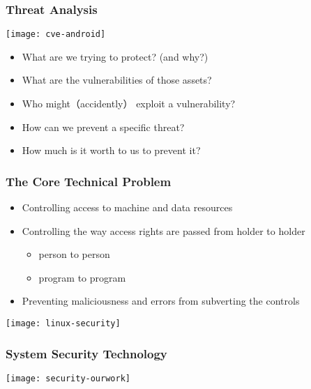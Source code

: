 \begin{frame}[plain]	
	\frametitle{Threat Analysis}
	
	\centering
	\texttt{[image: cve-android]}
	
	\begin{itemize}\large
		\item What are we trying to protect? (and why?)\pause
		\item What are the vulnerabilities of those assets?\pause
		\item Who might（accidently） exploit a vulnerability?  \pause
		\item How can we prevent a specific threat? \pause
		\item How much is it worth to us to prevent it? \pause
		
	\end{itemize}	
	

	
\end{frame}

\begin{frame}[plain]	
	\frametitle{The Core Technical Problem}
	
	\begin{itemize}\large
		\item Controlling access to machine and data resources
		\item Controlling the way access rights are passed from
		holder to holder
		\begin{itemize}\large
			\item person to person
			\item program to program
		\end{itemize}
		\item Preventing maliciousness and errors from subverting
		the controls

		
	\end{itemize}	
	
	\centering
	\texttt{[image: linux-security]}
	
\end{frame}

\begin{frame}[plain]	
	\frametitle{System Security Technology}

	
	\centering
	\texttt{[image: security-ourwork]}
	
\end{frame}

